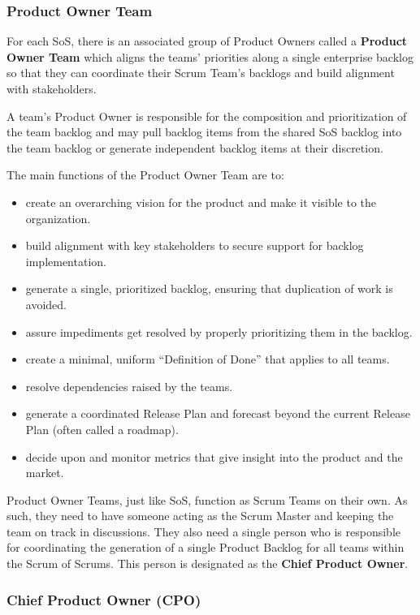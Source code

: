 \documentclass[12pt,a4paper,parskip=full]{scrartcl}
\begin{document}
\subsubsection{Product Owner Team}

For each SoS, there is an associated group of Product Owners called a \textbf{Product Owner Team} which aligns the teams' priorities along a single enterprise backlog so that they can coordinate their Scrum Team's backlogs and build alignment with stakeholders.

A team's Product Owner is responsible for the composition and prioritization of the team backlog and may pull backlog items from the shared SoS backlog into the team backlog or generate independent backlog items at their discretion.

The main functions of the Product Owner Team are to:

\begin{itemize}
	\item create an overarching vision for the product and make it visible to the organization.
	\item build alignment with key stakeholders to secure support for backlog implementation.
	\item generate a single, prioritized backlog, ensuring that duplication of work is avoided.
	\item assure impediments get resolved by properly prioritizing them in the backlog.
	\item create a minimal, uniform ``Definition of Done'' that applies to all teams.
	\item resolve dependencies raised by the teams.
	\item generate a coordinated Release Plan and forecast beyond the current Release Plan (often called a roadmap).
	\item decide upon and monitor metrics that give insight into the product and the market.
\end{itemize}

Product Owner Teams, just like SoS, function as Scrum Teams on their own. As such, they need to have someone acting as the Scrum Master and keeping the team on track in discussions. They also need a single person who is responsible for coordinating the generation of a single Product Backlog for all teams within the Scrum of Scrums. This person is designated as the \textbf{Chief Product Owner}.

\subsubsection{Chief Product Owner (CPO)}
\end{document}
